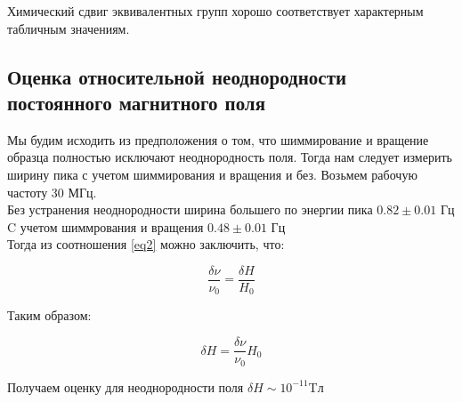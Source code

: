 Химический сдвиг эквивалентных групп хорошо соответствует характерным табличным значениям.

\subsection{Оценка относительной неоднородности постоянного магнитного поля}
Мы будим исходить из предположения о том, что шиммирование и вращение образца полностью исключают неоднородность поля.
Тогда нам следует измерить ширину пика с учетом шиммирования и вращения и без.
Возьмем рабочую частоту 30 МГц.\\
Без устранения неоднородности ширина большего по энергии пика $0.82\pm0.01$ Гц\\
C учетом шиммрования и вращения $0.48\pm0.01$ Гц\\

Тогда из соотношения \ref{eq2} можно заключить, что:

\begin{equation}
\label{eq3}
\frac{\delta\nu}{\nu_0} = \frac{\delta H}{H_0}
\end{equation}

Таким образом:

\begin{equation}
\label{eq4}
\delta H = \frac{\delta\nu}{\nu_0}H_0  
\end{equation}

Получаем оценку для неоднородности поля $\delta H \sim 10^{-11}  $\space Tл


